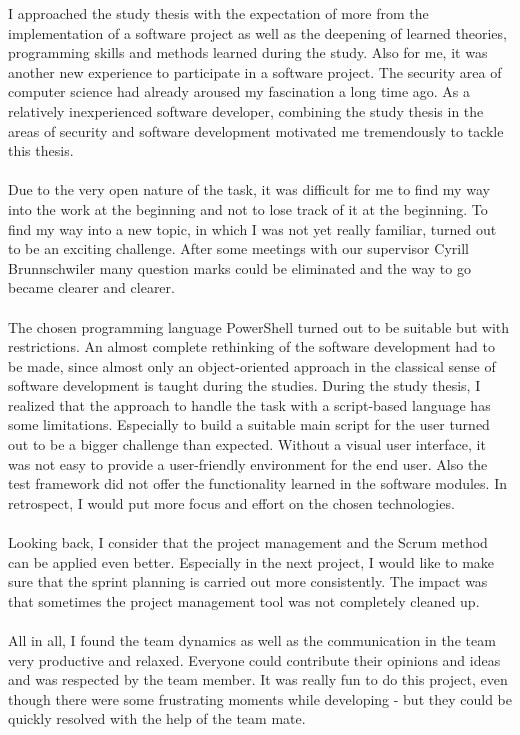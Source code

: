I approached the study thesis with the expectation of more from the implementation of a software project as well as the deepening of learned theories, programming skills and methods learned during the study. Also for me, it was another new experience to participate in a software project. The security area of computer science had already aroused my fascination a long time ago. As a relatively inexperienced software developer, combining the study thesis in the areas of security and software development motivated me tremendously to tackle this thesis.
\\\\
Due to the very open nature of the task, it was difficult for me to find my way into the work at the beginning and not to lose track of it at the beginning. To find my way into a new topic, in which I was not yet really familiar, turned out to be an exciting challenge. After some meetings with our supervisor Cyrill Brunnschwiler many question marks could be eliminated and the way to go became clearer and clearer.
\\\\
The chosen programming language PowerShell turned out to be suitable but with restrictions. An almost complete rethinking of the software development had to be made, since almost only an object-oriented approach in the classical sense of software development is taught during the studies. During the study thesis, I realized that the approach to handle the task with a script-based language has some limitations. Especially to build a suitable main script for the user turned out to be a bigger challenge than expected. Without a visual user interface, it was not easy to provide a user-friendly environment for the end user. Also the test framework did not offer the functionality learned in the software modules. In retrospect, I would put more focus and effort on the chosen technologies.
\\\\
Looking back, I consider that the project management and the Scrum method can be applied even better. Especially in the next project, I would like to make sure that the sprint planning is carried out more consistently. The impact was that sometimes the project management tool was not completely cleaned up.
\\\\
All in all, I found the team dynamics as well as the communication in the team very productive and relaxed. Everyone could contribute their opinions and ideas and was respected by the team member. It was really fun to do this project, even though there were some frustrating moments while developing - but they could be quickly resolved with the help of the team mate. 
